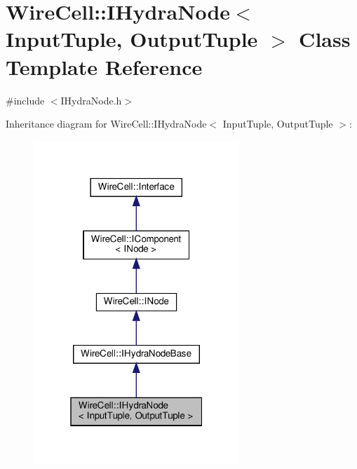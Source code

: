 \hypertarget{class_wire_cell_1_1_i_hydra_node}{}\section{Wire\+Cell\+:\+:I\+Hydra\+Node$<$ Input\+Tuple, Output\+Tuple $>$ Class Template Reference}
\label{class_wire_cell_1_1_i_hydra_node}


{\ttfamily \#include $<$I\+Hydra\+Node.\+h$>$}



Inheritance diagram for Wire\+Cell\+:\+:I\+Hydra\+Node$<$ Input\+Tuple, Output\+Tuple $>$\+:
\nopagebreak
\begin{figure}[H]
\begin{center}
\leavevmode
\includegraphics[width=220pt]{class_wire_cell_1_1_i_hydra_node__inherit__graph}
\end{center}
\end{figure}


